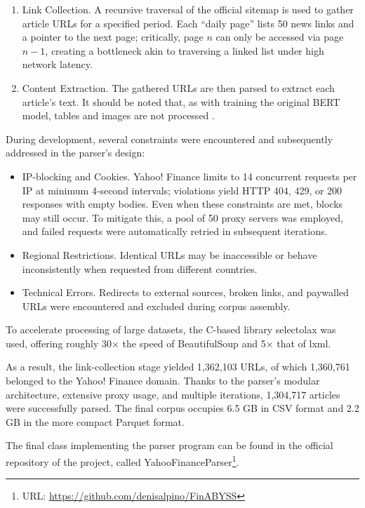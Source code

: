 \begin{enumerate}
    \item Link Collection. A recursive traversal of the official sitemap is used to gather article URLs for a specified
    period. Each “daily page” lists 50 news links and a pointer to the next page; critically, page $n$ can only be accessed
    via page $n - 1$, creating a bottleneck akin to traversing a linked list under high network latency.
    \item Content Extraction. The gathered URLs are then parsed to extract each article's text. It should be noted that,
    as with training the original BERT model, tables and images are not processed \parencite{devlin2019BERT}.
\end{enumerate}

During development, several constraints were encountered and subsequently addressed in the parser's design:

\begin{itemize}
    \item IP-blocking and Cookies. Yahoo! Finance limits to 14 concurrent requests per IP at minimum 4-second intervals;
    violations yield HTTP 404, 429, or 200 responses with empty bodies. Even when these constraints are met, blocks may
    still occur. To mitigate this, a pool of 50 proxy servers was employed, and failed requests were automatically retried
    in subsequent iterations.
    \item Regional Restrictions. Identical URLs may be inaccessible or behave inconsistently when requested from different
    countries.
    \item Technical Errors. Redirects to external sources, broken links, and paywalled URLs were encountered and excluded
    during corpus assembly.
\end{itemize}

To accelerate processing of large datasets, the C-based library selectolax was used, offering roughly 30× the speed
of BeautifulSoup and 5× that of lxml.

As a result, the link-collection stage yielded 1,362,103 URLs, of which 1,360,761 belonged to the Yahoo! Finance domain.
Thanks to the parser's modular architecture, extensive proxy usage, and multiple iterations, 1,304,717 articles were
successfully parsed. The final corpus occupies 6.5 GB in CSV format and 2.2 GB in the more compact Parquet format.

The final class implementing the parser program can be found in the official repository of the project, called
YahooFinanceParser\footnote{URL: \url{https://github.com/denisalpino/FinABYSS}}.

